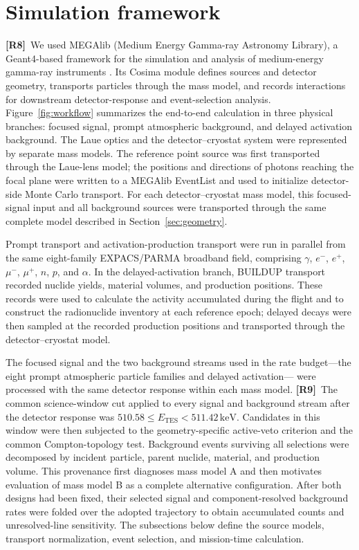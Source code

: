 \documentclass[11pt]{article}
\newcommand{\revmark}[1]{\textcolor{revisionblue}{\textbf{[R#1]}}\ }
\newcommand{\revblue}[1]{\textcolor{revisionblue}{#1}}
\newcommand{\keV}{\ensuremath{\,\mathrm{keV}}}
\begin{document}
\FloatBarrier

\section{Simulation framework}
\label{sec:framework}

\revmark{8}We used MEGAlib (Medium Energy Gamma-ray Astronomy Library), a
Geant4-based framework for the simulation and analysis of medium-energy
gamma-ray instruments \cite{Zoglauer2006,Agostinelli2003,Allison2016}. Its
Cosima module defines sources and detector geometry, transports particles
through the mass model, and records interactions for downstream detector-response
and event-selection analysis. Figure~\ref{fig:workflow} summarizes the end-to-end
calculation in three physical branches: focused signal, prompt atmospheric
background, and delayed activation background. The Laue optics and the
detector--cryostat system were represented by separate mass models. The
reference point source was first transported through the Laue-lens model; the
positions and directions of photons reaching the focal plane were written to a
MEGAlib EventList and used to initialize detector-side Monte Carlo transport.
For each detector--cryostat mass model, this focused-signal input and all
background sources were transported through the same complete model described
in Section~\ref{sec:geometry}.

Prompt transport and activation-production transport were run in parallel from
the same \revblue{eight-family EXPACS/PARMA broadband field, comprising
$\gamma$, $e^-$, $e^+$, $\mu^-$, $\mu^+$, $n$, $p$, and $\alpha$}. In
the delayed-activation branch, BUILDUP transport recorded nuclide yields,
material volumes, and production positions. These records were used to
calculate the activity accumulated during the flight and to construct the
radionuclide inventory at each reference epoch; delayed decays were then
sampled at the recorded production positions and transported through the
detector--cryostat model.

The focused signal and the \revblue{two background streams used in the rate
budget---the eight prompt atmospheric particle families and delayed
activation---} were processed with the same detector response within each
mass model. \revmark{9}The common science-window cut applied to every signal and
background stream after the detector response was
$510.58\leq E_{\mathrm{TES}}<511.42\keV$. Candidates in this window were then
subjected to the geometry-specific active-veto criterion and the common
Compton-topology test. Background events surviving all selections were
decomposed by incident particle, parent
nuclide, material, and production volume. This provenance first diagnoses mass
model A and then motivates evaluation of mass model B as a complete alternative
configuration. After both designs had been fixed, their selected signal and
component-resolved background rates were folded over the adopted trajectory to
obtain accumulated counts and unresolved-line sensitivity. The subsections
below define the source models, transport normalization, event selection, and
mission-time calculation.
\end{document}
